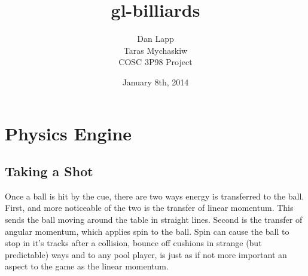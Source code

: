 \documentclass[12pt]{article}
\title{gl-billiards}
\author{Dan Lapp\\Taras Mychaskiw\\COSC 3P98 Project}
\date{January 8th, 2014}
\begin{document}
\maketitle
    \begin{abstract}
    \end{abstract}

    \thispagestyle{empty}
    \tableofcontents
    \thispagestyle{empty}
    \mbox{}
    \clearpage
    \setcounter{page}{1}
    
    \section{Physics Engine}
    
        \subsection{Taking a Shot}
        Once a ball is hit by the cue, there are two ways energy is transferred to the ball. First, and more noticeable of the two
        is the transfer of linear momentum. This sends the ball moving around the table in straight lines. Second is the transfer
        of angular momentum, which applies spin to the ball. Spin can cause the ball to stop in it's tracks after a collision,
        bounce off cushions in strange (but predictable) ways and to any pool player, is just as if not more important an aspect
        to the game as the linear momentum.
\end{document}

